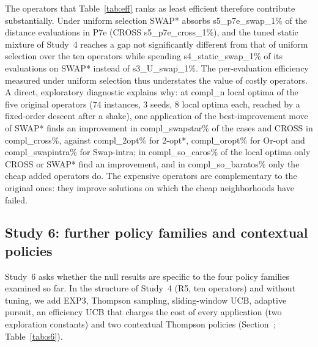 The operators that Table~\ref{tab:eff} ranks as least efficient therefore contribute substantially. Under uniform selection SWAP* absorbs \num{s5_p7e_swap_1}\% of the distance evaluations in P7e (CROSS \num{s5_p7e_cross_1}\%), and the tuned static mixture of Study~4 reaches a gap not significantly different from that of uniform selection over the ten operators while spending \num{s4_static_swap_1}\% of its evaluations on SWAP* instead of \num{s3_U_swap_1}\%. The per-evaluation efficiency measured under uniform selection thus understates the value of costly operators. A direct, exploratory diagnostic explains why: at \num{compl_n} local optima of the five original operators (74 instances, 3 seeds, 8 local optima each, reached by a fixed-order descent after a shake), one application of the best-improvement move of SWAP* finds an improvement in \num{compl_swapstar}\% of the cases and CROSS in \num{compl_cross}\%, against \num{compl_2opt}\% for 2-opt*, \num{compl_oropt}\% for Or-opt and \num{compl_swapintra}\% for Swap-intra; in \num{compl_so_caros}\% of the local optima only CROSS or SWAP* find an improvement, and in \num{compl_so_baratos}\% only the cheap added operators do. The expensive operators are complementary to the original ones: they improve solutions on which the cheap neighborhoods have failed.

\subsection{Study 6: further policy families and contextual policies}\label{sec:s6}
Study~6 asks whether the null results are specific to the four policy families examined so far. In the structure of Study~4 (R5, ten operators) and without tuning, we add EXP3, Thompson sampling, sliding-window UCB, adaptive pursuit, an efficiency UCB that charges the cost of every application (two exploration constants) and two contextual Thompson policies (Section~; Table~\ref{tab:s6}).



